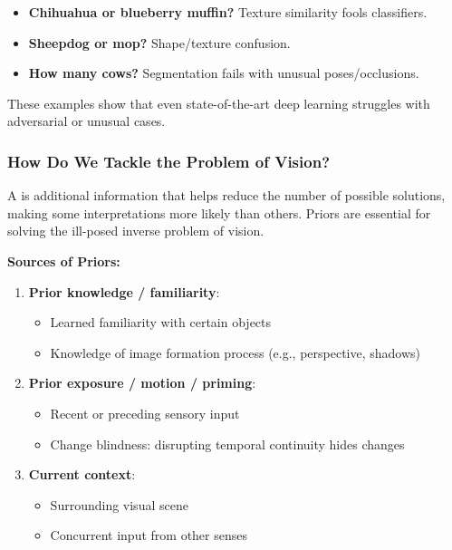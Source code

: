 \begin{exbox}
\begin{itemize}
  \item \textbf{Chihuahua or blueberry muffin?} Texture similarity fools classifiers.
  \item \textbf{Sheepdog or mop?} Shape/texture confusion.
  \item \textbf{How many cows?} Segmentation fails with unusual poses/occlusions.
\end{itemize}
These examples show that even state-of-the-art deep learning struggles with adversarial or unusual cases.
\end{exbox}

\bigseparator

\subsubsection{How Do We Tackle the Problem of Vision?}

\begin{defbox}
A  is additional information that helps reduce the number of possible solutions, making some interpretations more likely than others. Priors are essential for solving the ill-posed inverse problem of vision.
\end{defbox}

\textbf{Sources of Priors:}
\begin{enumerate}
  \item \textbf{Prior knowledge / familiarity}:
  \begin{itemize}
    \item Learned familiarity with certain objects
    \item Knowledge of image formation process (e.g., perspective, shadows)
  \end{itemize}
  \item \textbf{Prior exposure / motion / priming}:
  \begin{itemize}
    \item Recent or preceding sensory input
    \item Change blindness: disrupting temporal continuity hides changes
  \end{itemize}
  \item \textbf{Current context}:
  \begin{itemize}
    \item Surrounding visual scene
    \item Concurrent input from other senses
  \end{itemize}
\end{enumerate}

